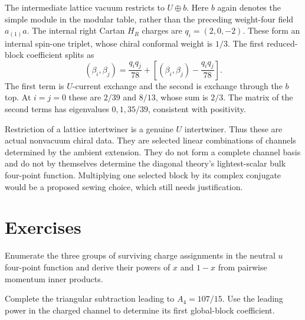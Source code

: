 The intermediate lattice vacuum restricts to $U\oplus b$.
Here $b$ again denotes the simple module in the modular table,
rather than the preceding weight-four field $a_{(1)}a$.
The internal right Cartan $H_R$ charges are $q_i=(2,0,-2)$.
These form an internal spin-one triplet, whose chiral conformal
weight is $1/3$. The first reduced-block coefficient splits as
\[
 (\beta_i,\beta_j)=\frac{q_iq_j}{78}
       +\left[(\beta_i,\beta_j)-\frac{q_iq_j}{78}\right].
\]
The first term is $U$-current exchange and the second is exchange
through the $b$ top. At $i=j=0$ these are $2/39$ and $8/13$,
whose sum is $2/3$. The matrix of the second terms has
eigenvalues $0,1,35/39$, consistent with positivity.

Restriction of a lattice intertwiner is a genuine $U$ intertwiner.
Thus these are actual nonvacuum chiral data. They are selected
linear combinations of channels determined by the ambient
extension. They do not form a complete channel basis and do not
by themselves determine the diagonal theory's lightest-scalar
bulk four-point function. Multiplying one selected block by its
complex conjugate would be a proposed sewing choice, which still
needs justification.

\section{Exercises}

\begin{exercise}\label{ex:corr-fifteen}
Enumerate the three groups of surviving charge assignments in
the neutral $u$ four-point function and derive their powers of
$x$ and $1-x$ from pairwise momentum inner products.

\par\smallskip{}\par
\end{exercise}

\begin{exercise}\label{ex:corr-blocks}
Complete the triangular subtraction leading to $A_4=107/15$.
Use the leading power in the charged channel to determine its
first global-block coefficient.

\par\smallskip{}\par
\end{exercise}


